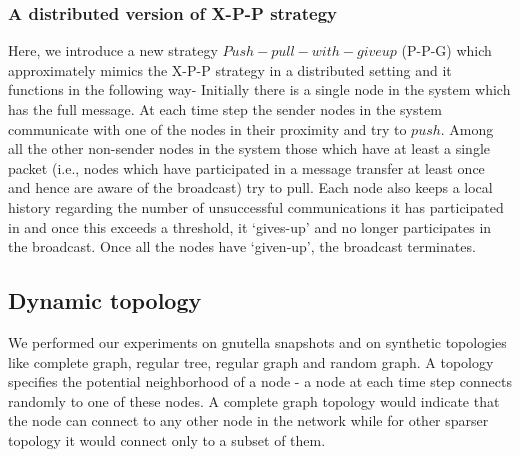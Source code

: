 \subsubsection{A distributed version of X-P-P strategy}
Here, we introduce a new strategy $Push-pull-with-giveup$ (P-P-G) which approximately mimics 
the X-P-P strategy in a distributed setting  and it functions in the following way-
Initially there  is a single node in the system which has the full message. At each time step the sender nodes in the system communicate with one of the nodes 
in their proximity and try to $push$. Among all the other non-sender nodes in the system those which have at least a single packet (i.e., nodes which have participated 
in a message transfer at least once and hence are aware of the broadcast) try to pull. Each node also keeps a local history regarding the number of unsuccessful 
communications it has participated in and once this exceeds a threshold, it `gives-up' and no longer 
participates in the broadcast. Once all the nodes have `given-up', the broadcast terminates.


\subsection{Dynamic topology}
We performed our experiments on gnutella snapshots and on synthetic topologies like complete graph, regular tree, regular graph and random graph. 
A topology specifies the potential neighborhood of a node 
- a node at each time step connects randomly to one of these nodes. A complete graph 
topology would indicate that the 
node can connect to any other node in the network while for other sparser topology it would 
connect only to a subset of them.
